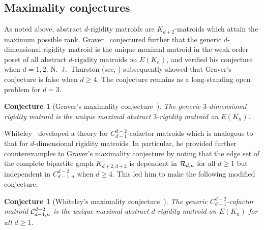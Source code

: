 \documentclass{daj}
\newtheorem{conjecture}[thm]{Conjecture}\theoremstyle{plain}
\begin{document}
\subsection{Maximality conjectures}
As noted above, abstract $d$-rigidity matroids are $K_{d+2}$-matroids which attain the maximum possible rank.
Graver~\cite{G91} conjectured further that the generic $d$-dimensional rigidity matroid is the unique maximal matroid in the weak order poset of all abstract $d$-rigidity matroids on $E(K_n)$, and verified his conjecture when $d=1,2$.
 N.~J.~Thurston (see, \cite[page 150]{GSS93}) subsequently showed that Graver's conjecture is false when $d\geq 4$.
The conjecture remains as a long-standing open problem for $d=3$.

\begin{conjecture}[Graver's maximality conjecture~{\cite{G91}}]\label{conj:rigidty_maximality}
The generic $3$-dimensional rigidity matroid is the unique maximal abstract $3$-rigidity matroid on $E(K_n)$.
\end{conjecture}

 Whiteley~\cite{Wsurvey}  developed a theory for $C_{d-1}^{d-2}$-cofactor matroids which is analogous to that for $d$-dimensional rigidity matroids. In particular, he provided further counterexamples to Graver's maximality conjecture  by noting that the edge set of the complete bipartite graph $K_{d+2,d+2}$ is dependent in ${\cal R}_{d,n}$ for all $d\geq 1$ but independent in $C_{d-1,n}^{d-2}$ when $d\geq 4$.  This led him to make the following modified conjecture.

\begin{conjecture}[Whiteley's maximality conjecture~{\cite[Conjecture 11.5.1]{Wsurvey}}]\label{conj:max_cofactor}
The generic  $C_{d-1}^{d-2}$-cofactor matroid ${\cal C}_{d-1,n}^{d-2}$ is the unique maximal abstract $d$-rigidity matroid on $E(K_n)$ for all $d\geq 1$.
\end{conjecture}
\end{document}

